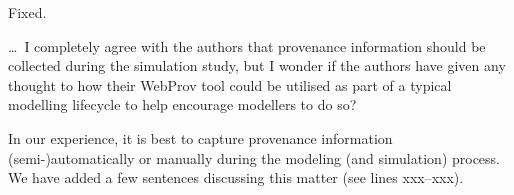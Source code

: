 \documentclass{article}
\begin{document}
Fixed.

\begin{mdframed}
\ldots\, I completely agree with the authors that provenance information should be collected during the simulation study, but I wonder if the authors have given any thought to how their WebProv tool could be utilised as part of a typical modelling lifecycle to help encourage modellers to do so?
\end{mdframed}

In our experience, it is best to capture provenance information (semi-)automatically or manually during the modeling (and simulation) process.
We have added a few sentences discussing this matter (see lines xxx--xxx).




\end{document}
